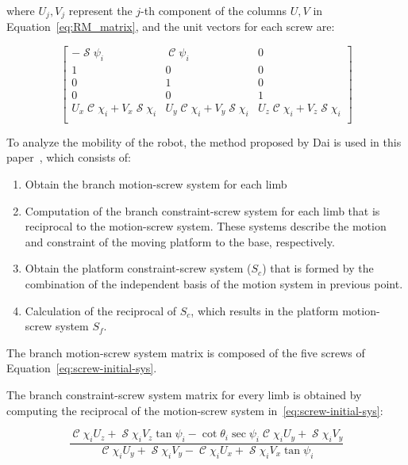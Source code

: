 \documentclass[titlepage, letterpaper]{article}
\DeclareMathOperator{\cose}{\mathcal{C}}
\DeclareMathOperator{\sen}{\mathcal{S}}
\begin{document}
where $U_j, V_j$ represent the $j$-th component of the columns $U, V$ in Equation~\ref{eq:RM_matrix}, and the unit vectors for each screw are:

\begin{equation}
    \label{eq:screw_init_sys_units}
    \begin{bmatrix}
     -\sen \psi _i & \cose \psi _i & 0 \\
     1 & 0 & 0 \\
     0 & 1 & 0 \\
     0 & 0 & 1 \\
     U_x \cose \chi _i + V_x \sen \chi _i& U_y \cose \chi _i +V_y \sen \chi _i & U_z \cose \chi _i + V_z \sen \chi _i \\
    \end{bmatrix}
\end{equation}

To analyze the mobility of the robot, the method proposed by Dai is used in this paper~\cite{Rodriguez-Leal10}, which consists of:

\begin{enumerate}
    \item Obtain the branch motion-screw system for each limb
    \item Computation of the branch constraint-screw system for each limb that is reciprocal to the motion-screw system. These systems describe the motion and constraint of the moving platform to the base, respectively.
    \item Obtain the platform constraint-screw system ($S_c$) that is formed by the combination of the independent basis of the motion system in previous point.
    \item Calculation of the reciprocal of $S_c$, which results in the platform motion-screw system $S_f$.
\end{enumerate}

The branch motion-screw system matrix is composed of the five screws of Equation~\ref{eq:screw-initial-sys}.

The branch constraint-screw system matrix for every limb is obtained by computing the reciprocal of the motion-screw system in~\ref{eq:screw-initial-sys}:

\begin{equation}
    \label{eq:constraint-screw1}
    \frac{\cose \chi _i U_z+\sen \chi _i V_z \tan \psi _i-\cot \theta _i \sec \psi _i \cose \chi _i U_y+\sen \chi _i V_y}{\cose \chi _i U_y+\sen \chi _i V_y-\cose \chi _i U_x+\sen \chi _i V_x \tan \psi _i}
\end{equation}
\end{document}
